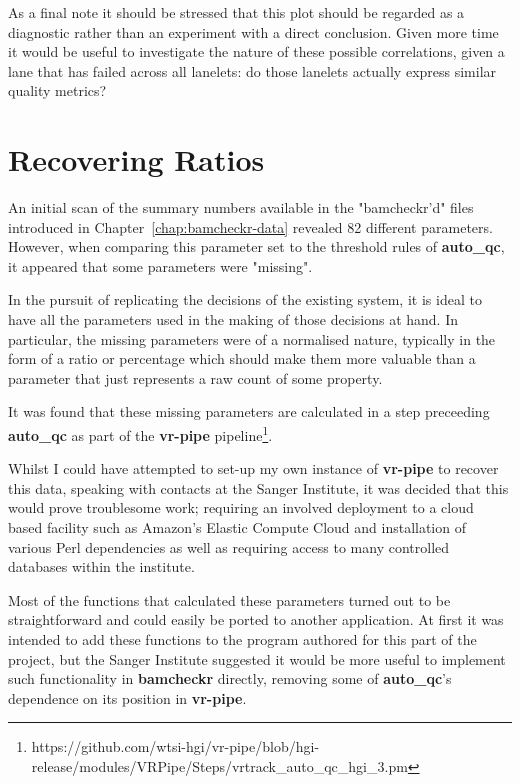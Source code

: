 As a final note it should be stressed that this plot should be regarded as a
diagnostic rather than an experiment with a direct conclusion. Given more time it
would be useful to investigate the nature of these possible correlations, given
a lane that has failed across all lanelets: do those lanelets actually express
similar quality metrics?

\section{Recovering Ratios}

An initial scan of the summary numbers available in the "bamcheckr'd" files
introduced in Chapter~\ref{chap:bamcheckr-data} revealed 82 different
parameters. However, when comparing this parameter set to the threshold rules of
\textbf{auto\_qc}, it appeared that some parameters were "missing".

In the pursuit of replicating the decisions of the
existing system, it is ideal to have all the parameters used in the making of
those decisions at hand. In particular, the missing parameters were of a
normalised nature, typically in the form of a ratio or percentage which should
make them more valuable than a parameter that just represents a raw count of
some property.

It was found that these missing parameters are calculated in a step preceeding
\textbf{auto\_qc} as part of the \textbf{vr-pipe}
pipeline\footnote{https://github.com/wtsi-hgi/vr-pipe/blob/hgi-release/modules/VRPipe/Steps/vrtrack\_auto\_qc\_hgi\_3.pm}.


Whilst I could have attempted to set-up my own instance of \textbf{vr-pipe} to
recover this data, speaking with contacts at the Sanger Institute, it was
decided that this would prove troublesome work; requiring an involved
deployment to a cloud based facility such as Amazon's Elastic Compute Cloud and
installation of various Perl dependencies as well as requiring access to many
controlled databases within the institute.

Most of the functions that calculated these parameters turned out to be
straightforward and could easily be ported to another application. At first
it was intended to add these functions to the program authored for this part of
the project, but the Sanger Institute suggested it would be more useful to
implement such functionality in \textbf{bamcheckr} directly, removing some of
\textbf{auto\_qc}'s dependence on its position in \textbf{vr-pipe}.

